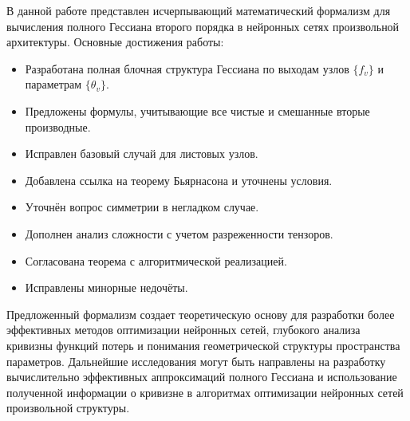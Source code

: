 \documentclass[11pt]{article}
\begin{document}
В данной работе представлен исчерпывающий математический формализм для вычисления полного Гессиана второго
порядка в нейронных сетях произвольной архитектуры. Основные достижения работы:

\begin{itemize}
  \item Разработана полная блочная структура Гессиана по выходам узлов $\{f_v\}$ и параметрам $\{\theta_v\}$.
  \item Предложены формулы, учитывающие все чистые и смешанные вторые производные.
  \item Исправлен базовый случай для листовых узлов.
  \item Добавлена ссылка на теорему Бьярнасона и уточнены условия.
  \item Уточнён вопрос симметрии в негладком случае.
  \item Дополнен анализ сложности с учетом разреженности тензоров.
  \item Согласована теорема с алгоритмической реализацией.
  \item Исправлены минорные недочёты.
\end{itemize}

Предложенный формализм создает теоретическую основу для разработки более эффективных методов оптимизации
нейронных сетей, глубокого анализа кривизны функций потерь и понимания геометрической структуры пространства
параметров. Дальнейшие исследования могут быть направлены на разработку вычислительно эффективных
аппроксимаций полного Гессиана и использование полученной информации о кривизне в алгоритмах оптимизации
нейронных сетей произвольной структуры.
\end{document}
